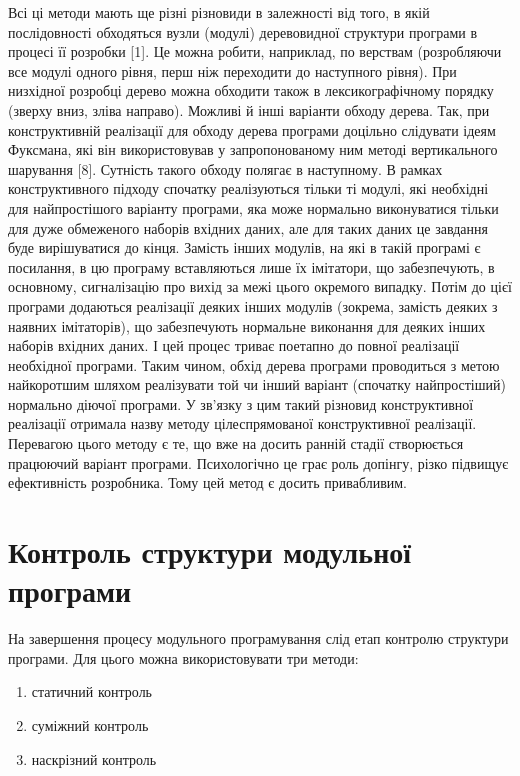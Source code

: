 \documentclass[a4paper,14pt, titlepage]{article}
\begin{document}
Всі ці методи мають ще різні різновиди в залежності від того, в якій
послідовності обходяться вузли (модулі) деревовидної структури програми
в процесі її розробки [1]. Це можна робити, наприклад, по верствам
(розробляючи все модулі одного рівня, перш ніж переходити до наступного
рівня). При низхідної розробці дерево можна обходити також в
лексикографічному порядку (зверху вниз, зліва направо). Можливі й інші
варіанти обходу дерева. Так, при конструктивній реалізації для обходу
дерева програми доцільно слідувати ідеям Фуксмана, які він
використовував у запропонованому ним методі вертикального шарування
[8]. Сутність такого обходу полягає в наступному. В рамках
конструктивного підходу спочатку реалізуються тільки ті модулі, які
необхідні для найпростішого варіанту програми, яка може нормально
виконуватися тільки для дуже обмеженого наборів вхідних даних,
але для таких даних це завдання буде вирішуватися до кінця. Замість
інших модулів, на які в такій програмі є посилання, в цю програму
вставляються лише їх імітатори, що забезпечують, в основному,
сигналізацію про вихід за межі цього окремого випадку. Потім до цієї
програми додаються реалізації деяких інших модулів (зокрема, замість
деяких з наявних імітаторів), що забезпечують нормальне виконання для
деяких інших наборів вхідних даних. І цей процес триває поетапно до
повної реалізації необхідної програми. Таким чином, обхід дерева
програми проводиться з метою найкоротшим шляхом реалізувати той чи інший
варіант (спочатку найпростіший) нормально діючої програми. У зв'язку з
цим такий різновид конструктивної реалізації отримала назву методу
цілеспрямованої конструктивної реалізації. Перевагою цього методу є те,
що вже на досить ранній стадії створюється працюючий варіант програми.
Психологічно це грає роль допінгу, різко підвищує ефективність
розробника. Тому цей метод є досить привабливим.


\section{Контроль структури модульної програми}

На завершення процесу модульного програмування слід етап контролю
структури програми. Для цього можна використовувати три методи:
\begin{enumerate}
    \item статичний контроль
    \item суміжний контроль
    \item наскрізний контроль
\end{enumerate}
\end{document}
